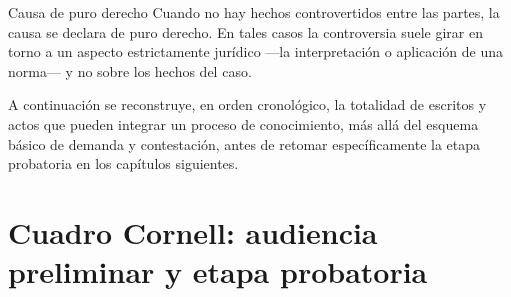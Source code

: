 \documentclass[12pt,oneside]{book}
\begin{document}
\begin{definition}{Causa de puro derecho}
Cuando no hay hechos controvertidos entre las partes, la causa se declara de puro derecho. En tales casos la controversia suele girar en torno a un aspecto estrictamente jurídico ---la interpretación o aplicación de una norma--- y no sobre los hechos del caso.
\end{definition}

A continuación se reconstruye, en orden cronológico, la totalidad de escritos y actos que pueden integrar un proceso de conocimiento, más allá del esquema básico de demanda y contestación, antes de retomar específicamente la etapa probatoria en los capítulos siguientes.

\section*{Cuadro Cornell: audiencia preliminar y etapa probatoria}
\end{document}
